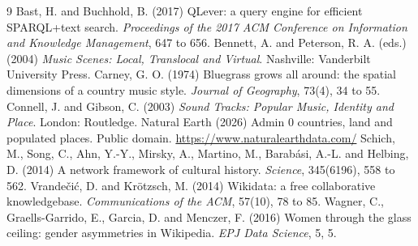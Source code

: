 \documentclass[11pt,a4paper]{article}
\begin{document}
\begin{thebibliography}{9}
 Bast, H. and Buchhold, B. (2017) QLever: a query engine for efficient SPARQL+text search. \emph{Proceedings of the 2017 ACM Conference on Information and Knowledge Management}, 647 to 656.
 Bennett, A. and Peterson, R. A. (eds.) (2004) \emph{Music Scenes: Local, Translocal and Virtual}. Nashville: Vanderbilt University Press.
 Carney, G. O. (1974) Bluegrass grows all around: the spatial dimensions of a country music style. \emph{Journal of Geography}, 73(4), 34 to 55.
 Connell, J. and Gibson, C. (2003) \emph{Sound Tracks: Popular Music, Identity and Place}. London: Routledge.
 Natural Earth (2026) Admin 0 countries, land and populated places. Public domain. \url{https://www.naturalearthdata.com/}
 Schich, M., Song, C., Ahn, Y.-Y., Mirsky, A., Martino, M., Barab\'asi, A.-L. and Helbing, D. (2014) A network framework of cultural history. \emph{Science}, 345(6196), 558 to 562.
 Vrandečić, D. and Krötzsch, M. (2014) Wikidata: a free collaborative knowledgebase. \emph{Communications of the ACM}, 57(10), 78 to 85.
 Wagner, C., Graells-Garrido, E., Garcia, D. and Menczer, F. (2016) Women through the glass ceiling: gender asymmetries in Wikipedia. \emph{EPJ Data Science}, 5, 5.
\end{thebibliography}
\end{document}
